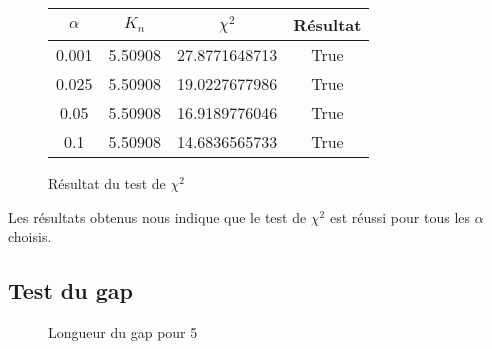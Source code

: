 \documentclass[a4paper,10pt]{article}
\begin{document}
\begin{figure}[h!]
\begin{center}
\begin{tabular}{|c|c|c|c|}
\hline
$\alpha$ & $K_n$ & $\chi^2$ & Résultat\\
\hline
0.001 & 5.50908 & 27.8771648713 & True\\
0.025 & 5.50908 & 19.0227677986 & True\\
0.05 & 5.50908 & 16.9189776046 & True\\
0.1 & 5.50908 & 14.6836565733 & True\\
\hline
\end{tabular}
\end{center}
\caption{Résultat du test de $\chi^2$}
\end{figure}

Les résultats obtenus nous indique que le test de $\chi^2$ est réussi pour tous les $\alpha$ choisis.
\subsection{Test du gap}

\begin{figure}[H]
\caption{Longueur du gap pour 5}
\label{khi2histo}
\end{figure}

\end{document}
